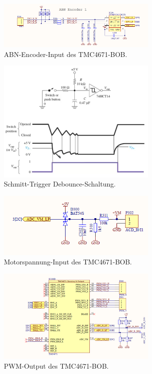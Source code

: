 \begin{figure}[H]
	\centering
	\includegraphics[width=0.7\textwidth]{graphics/TMC4671_ABN_Encoder_BOB_Schematic}
	\caption{ABN-Encoder-Input des TMC4671-BOB.}
	\label{fig:Schema_ABN_Encoder_FOC_Treiber}
\end{figure} 

\begin{figure}[H]
	\centering
	\includegraphics[width=0.7\textwidth]{graphics/Schmitt_Trigger_Debounce}
	\caption{Schmitt-Trigger Debounce-Schaltung.}
	\label{fig:Schmitt_Trigger_Debounce}
\end{figure} 

\begin{figure}[H]
	\centering
	\includegraphics[width=0.7\textwidth]{graphics/TMC4671_Motorspannung_BOB_Schematic}
	\caption{Motorspannung-Input des TMC4671-BOB.}
	\label{fig:Schema_Motorspannung_FOC_Treiber}
\end{figure} 

\begin{figure}[H]
	\centering
	\includegraphics[width=0.7\textwidth]{graphics/TMC4671_PWM_BOB_Schematic}
	\caption{PWM-Output des TMC4671-BOB.}
	\label{fig:Schema_PWM_FOC_Treiber}
\end{figure} 

